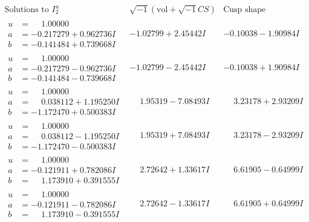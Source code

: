 \documentclass[1p]{elsarticle_modified}
\theoremstyle{definition}
\newcommand{\I}{\sqrt{-1}}
\begin{document}
$$\begin{array}{c|c|c}  
\text{Solutions to }I^u_{2}& \I (\text{vol} + \sqrt{-1}CS) & \text{Cusp shape}\\
 \hline 
\begin{aligned}
u &= \phantom{-}1.00000\phantom{ +0.000000I} \\
a &= -0.217279 + 0.962736 I \\
b &= -0.141484 + 0.739668 I\end{aligned}
 & -1.02799 + 2.45442 I & -0.10038 - 1.90984 I \\ \hline\begin{aligned}
u &= \phantom{-}1.00000\phantom{ +0.000000I} \\
a &= -0.217279 - 0.962736 I \\
b &= -0.141484 - 0.739668 I\end{aligned}
 & -1.02799 - 2.45442 I & -0.10038 + 1.90984 I \\ \hline\begin{aligned}
u &= \phantom{-}1.00000\phantom{ +0.000000I} \\
a &= \phantom{-}0.038112 + 1.195250 I \\
b &= -1.172470 + 0.500383 I\end{aligned}
 & \phantom{-}1.95319 - 7.08493 I & \phantom{-}3.23178 + 2.93209 I \\ \hline\begin{aligned}
u &= \phantom{-}1.00000\phantom{ +0.000000I} \\
a &= \phantom{-}0.038112 - 1.195250 I \\
b &= -1.172470 - 0.500383 I\end{aligned}
 & \phantom{-}1.95319 + 7.08493 I & \phantom{-}3.23178 - 2.93209 I \\ \hline\begin{aligned}
u &= \phantom{-}1.00000\phantom{ +0.000000I} \\
a &= -0.121911 + 0.782086 I \\
b &= \phantom{-}1.173910 + 0.391555 I\end{aligned}
 & \phantom{-}2.72642 + 1.33617 I & \phantom{-}6.61905 - 0.64999 I \\ \hline\begin{aligned}
u &= \phantom{-}1.00000\phantom{ +0.000000I} \\
a &= -0.121911 - 0.782086 I \\
b &= \phantom{-}1.173910 - 0.391555 I\end{aligned}
 & \phantom{-}2.72642 - 1.33617 I & \phantom{-}6.61905 + 0.64999 I \\ \hline\begin{aligned}

\end{aligned}
\end{array}$$
\end{document}
